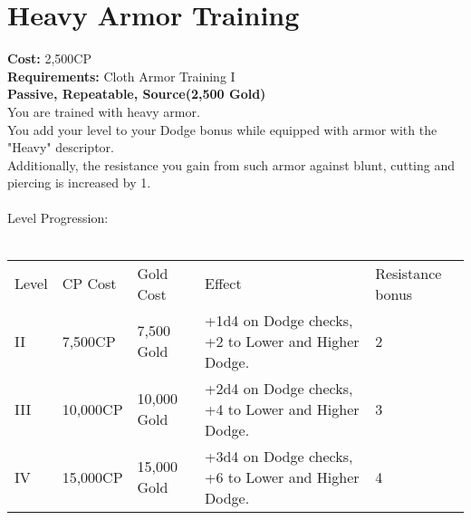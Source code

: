 \section{Heavy Armor Training}\label{perk:heavyArmorTraining}
\textbf{Cost:} 2,500CP\\
\textbf{Requirements:} Cloth Armor Training I\\
\textbf{Passive, Repeatable, Source(2,500 Gold)}\\
You are trained with heavy armor.\\
You add your level to your Dodge bonus while equipped with armor with the "Heavy" descriptor.\\
Additionally, the resistance you gain from such armor against blunt, cutting and piercing is increased by 1.\\
\\

Level Progression:\\
\\
\begin{tabular}{l | l | l | l | l}
    Level & CP Cost & Gold Cost & Effect & Resistance bonus \\
    II
    & 7,500CP
    & 7,500 Gold
    & +1d4 on Dodge checks, +2 to Lower and Higher Dodge.
    & 2
    \\
    III
    & 10,000CP
    & 10,000 Gold
    & +2d4 on Dodge checks, +4 to Lower and Higher Dodge.
    & 3
    \\
    IV
    & 15,000CP
    & 15,000 Gold
    & +3d4 on Dodge checks, +6 to Lower and Higher Dodge.
    & 4
    \\
\end{tabular}
